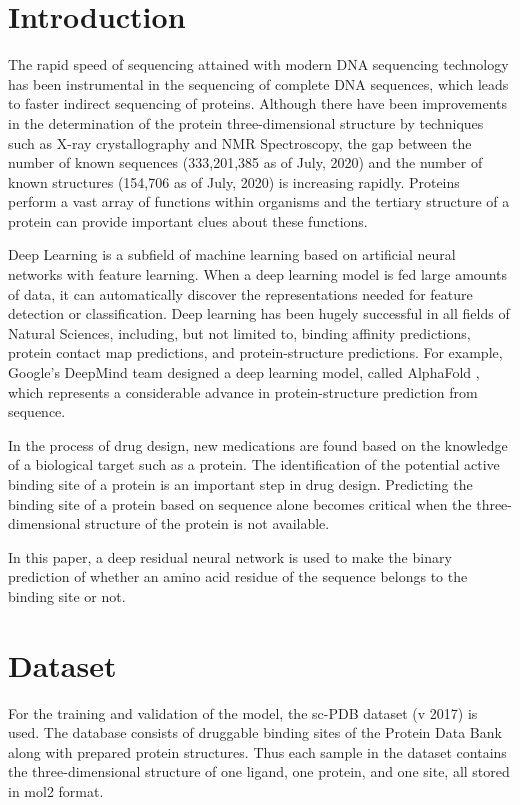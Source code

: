 \documentclass[journal=jacsat,manuscript=article]{achemso}
\begin{document}
\section{Introduction}
\quad The rapid speed of sequencing attained with modern DNA sequencing technology has been instrumental in the sequencing of complete DNA sequences, which leads to faster indirect sequencing of proteins. Although there have been improvements in the determination of the protein three-dimensional structure by techniques such as X-ray crystallography and NMR Spectroscopy, the gap between the number of known sequences (333,201,385 as of July, 2020) and the number of known structures (154,706 as of July, 2020) is increasing rapidly. Proteins perform a vast array of functions within organisms and the tertiary structure of a protein can provide important clues about these functions.

Deep Learning is a subfield of machine learning based on artificial neural networks with feature learning. When a deep learning model is fed large amounts of data, it can automatically discover the representations needed for feature detection or classification. Deep learning has been hugely successful in all fields of Natural Sciences, including, but not limited to, binding affinity predictions, protein contact map predictions, and protein-structure predictions. For example, Google's DeepMind team designed a deep learning model, called AlphaFold \cite{senior2020improved}, which represents a considerable advance in protein-structure prediction from sequence.

In the process of drug design, new medications are found based on the knowledge of a biological target such as a protein. The identification of the potential active binding site of a protein is an important step in drug design. Predicting the binding site of a protein based on sequence alone becomes critical when the three-dimensional structure of the protein is not available.

In this paper, a deep residual neural network is used to make the binary prediction of whether an amino acid residue of the sequence belongs to the binding site or not.

\section{Dataset}
\quad For the training and validation of the model, the sc-PDB\cite{desaphy2015sc} dataset (v 2017) is used. The database consists of druggable binding sites of the Protein Data Bank along with prepared protein structures. Thus each sample in the dataset contains the three-dimensional structure of one ligand, one protein, and one site, all stored in mol2 format.
\end{document}
